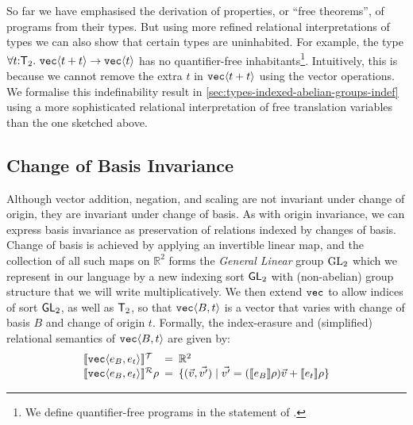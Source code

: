 \begin{example}\label{ex:uninhabited-type}
  So far we have emphasised the derivation of properties, or ``free
  theorems'', of programs from their types. But using more refined
  relational interpretations of types we can also show that certain
  types are uninhabited. For example, the type $\forall t \mathord:
  \mathsf{T}_2.\ \textup{\texttt{vec}}\langle t + t \rangle \to \textup{\texttt{vec}}\langle t \rangle$ has no
  quantifier-free inhabitants\footnote{We define quantifier-free
    programs in the statement of
    .}. Intuitively, this is because we cannot
  remove the extra $t$ in $\textup{\texttt{vec}}\langle t+t \rangle$ using the
  vector operations. We formalise this indefinability result in
  \autoref{sec:types-indexed-abelian-groups-indef} using a more
  sophisticated relational interpretation of free translation
  variables than the one sketched above.
\end{example}

\subsection{Change of Basis Invariance}
\label{sec:motivation-generalising}

Although vector addition, negation, and scaling are not invariant
under change of origin, they are invariant under change of basis. As
with origin invariance, we can express basis invariance as
preservation of relations indexed by changes of basis. Change of basis
is achieved by applying an invertible linear map, and the collection of
all such maps on $\mathbb{R}^2$ forms the \emph{General Linear} group
$\mathrm{GL}_2$ which we represent in our language by a new indexing sort
$\mathsf{GL}_2$ with (non-abelian) group structure that we will write
multiplicatively. We then extend $\textup{\texttt{vec}}$ to allow indices of
sort $\mathsf{GL}_2$, as well as $\mathsf{T}_2$, so that
$\textup{\texttt{vec}}\langle B,t \rangle$ is a vector that varies with change of basis $B$
and change of origin $t$. Formally, the index-erasure and (simplified)
relational semantics of $\textup{\texttt{vec}}\langle B,t \rangle$ are given by:
\begin{displaymath}
  \begin{array}{l@{\hspace{0.5em}=\hspace{0.5em}}l}
    \tySem{\tyPrim{vec}{e_B,e_t}} & \mathbb{R}^2
    \\ \rsem{\tyPrim{vec}{e_B,e_t}}{}\rho & \{ (\vec{v},\vec{v'})
    \sepbar \vec{v'} = (\sem{e_B}\rho)\vec{v} + \sem{e_t}\rho \}
  \end{array}
\end{displaymath}

